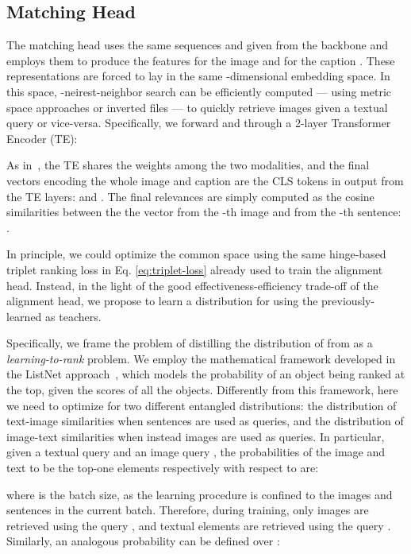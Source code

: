\documentclass[sigconf]{acmart}
\begin{document}
\subsection{Matching Head}
\label{sec:matching-head}
The matching head uses the same sequences  and  given from the backbone and employs them to produce the features  for the image  and  for the caption . These representations are forced to lay in the same -dimensional embedding space. In this space, -neirest-neighbor search can be efficiently computed --- using metric space approaches or inverted files --- to quickly retrieve images given a textual query or vice-versa.
Specifically, we forward  and  through a 2-layer Transformer Encoder (TE):

As in~\citep{messina2021transformer}, the TE shares the weights among the two modalities, and the final vectors encoding the whole image and caption are the CLS tokens in output from the TE layers:  and .
The final relevances are simply computed as the cosine similarities between the the vector  from the -th image and  from the -th sentence: .

In principle, we could optimize the common space using the same hinge-based triplet ranking loss in Eq. \ref{eq:triplet-loss} already used to train the alignment head. Instead, in the light of the good effectiveness-efficiency trade-off of the alignment head, we propose to learn a distribution for  using the previously-learned  as teachers.

Specifically, we frame the problem of distilling the distribution of  from  as a \textit{learning-to-rank} problem.
We employ the mathematical framework developed in the ListNet approach~\citep{cao2007learning}, which models the probability of an object being ranked at the top, given the scores of all the objects. Differently from this framework, here we need to optimize for two different entangled distributions: the distribution of text-image similarities when sentences are used as queries, and the distribution of image-text similarities when instead images are used as queries.
In particular, given a textual query  and an image query , the probabilities of the image  and text  to be the top-one elements respectively with respect to  are:

where  is the batch size, as the learning procedure is confined to the images and sentences in the current batch. Therefore, during training, only  images are retrieved using the query , and  textual elements are retrieved using the query .
Similarly, an analogous probability can be defined over :
\end{document}
